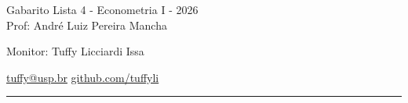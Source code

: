 \documentclass[12pt,letterpaper, onecolumn]{exam}
\begin{document}
\begingroup  
    \centering
    \LARGE Gabarito Lista 4 - Econometria I - 2026\\[0.5em]
    \large Prof: André Luiz Pereira Mancha \par
    \large Monitor: Tuffy Licciardi Issa  \par
        \small \href{mailto:tuffy@usp.br}{tuffy@usp.br} \quad
    \href{https://github.com/Tuffyli}{github.com/tuffyli} \par
\endgroup
\rule{\textwidth}{0.4pt}
\pointsdroppedatright   %
\printanswers
\renewcommand{\solutiontitle}{\noindent\textbf{Ans:}\enspace}   %
\newcommand{\qstar}{\hspace{-0.6em}\textsuperscript{*}\hspace{0.2em}}
\end{document}
